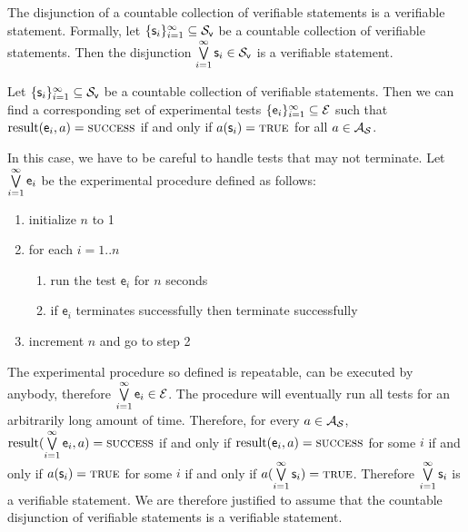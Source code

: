 	\begin{mathSection}
		\begin{axiom}\label{pm-vs-axiomCountableDisjunction}
			The disjunction of a countable collection of verifiable statements is a verifiable statement. Formally, let $\{\mathsf{s}_i\}_{i=1}^{\infty} \subseteq \mathcal{S}_\textsf{v}$ be a countable collection of verifiable statements. Then the disjunction $\bigvee\limits_{i=1}^{\infty} \mathsf{s}_i \in \mathcal{S}_\textsf{v}$ is a verifiable statement.
		\end{axiom}
		\begin{justification}
			Let $\{\mathsf{s}_i\}_{i=1}^{\infty} \subseteq \mathcal{S}_\textsf{v}$ be a countable collection of verifiable statements. Then we can find a corresponding set of experimental tests $\{\mathsf{e}_i\}_{i=1}^{\infty} \subseteq \mathcal{E}$ such that $\operatorname{result}(\mathsf{e}_i, a) = \textsc{success}$ if and only if $a(\mathsf{s}_i) = \textup{\textsc{true}}$ for all $a \in \mathcal{A}_{\mathcal{S}}$.
			
			
			In this case, we have to be careful to handle tests that may not terminate. Let $\bigvee\limits_{i=1}^{\infty} \mathsf{e}_i$ be the experimental procedure defined as follows:
			\begin{enumerate}
				\item initialize $n$ to 1
				\item for each $i=1..n$
				\begin{enumerate}
					\item run the test $\mathsf{e}_i$ for $n$ seconds
					\item if $\mathsf{e}_i$ terminates successfully then terminate successfully
				\end{enumerate}
				\item increment $n$ and go to step 2
			\end{enumerate}
			The experimental procedure so defined is repeatable, can be executed by anybody, therefore $\bigvee\limits_{i=1}^{\infty} \mathsf{e}_i \in \mathcal{E}$. The procedure will eventually run all tests for an arbitrarily long amount of time. Therefore, for every $a \in \mathcal{A}_{\mathcal{S}}$, $\operatorname{result}(\bigvee\limits_{i=1}^{\infty} \mathsf{e}_i, a) = \textsc{success}$ if and only if $\operatorname{result}(\mathsf{e}_i, a) = \textsc{success}$ for some $i$ if and only if $a(\mathsf{s}_i) = \textup{\textsc{true}}$ for some $i$ if and only if $a(\bigvee\limits_{i=1}^{\infty}\mathsf{s}_i) = \textup{\textsc{true}}$. Therefore $\bigvee\limits_{i=1}^{\infty}\mathsf{s}_i$ is a verifiable statement. We are therefore justified to assume that the countable disjunction of verifiable statements is a verifiable statement.
			

\end{justification}
\end{mathSection}
